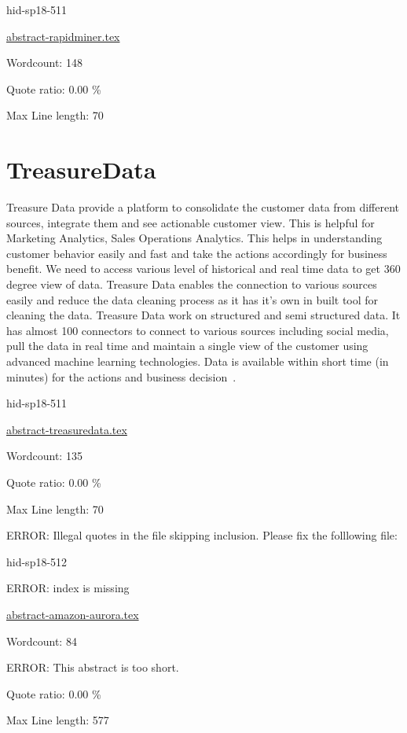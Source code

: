 \begin{IU}

hid-sp18-511

\href{https://github.com/cloudmesh-community/hid-sp18-511/blob/master//technology/abstract-rapidminer.tex}{abstract-rapidminer.tex}

 

Wordcount: 148


Quote ratio: 0.00 \%
 
Max Line length: 70
\end{IU}

\section{TreasureData}

Treasure Data provide a platform to consolidate the customer data from
different sources, integrate them and see actionable customer view.
This is helpful for Marketing Analytics, Sales Operations Analytics.
This helps in understanding customer behavior easily and fast and take
the actions accordingly for business benefit. We need to access
various level of historical and real time data to get 360 degree view
of data. Treasure Data enables the connection to various sources
easily and reduce the data cleaning process as it
has it's own in built tool for cleaning the data. Treasure Data work
on structured and semi structured data. It has almost 100 connectors
to connect to various sources including social media, pull the data in
real time and maintain a single view of the customer using advanced
machine learning technologies. Data is available within short time (in
minutes) for the actions and business
decision~\cite{hid-sp18-511-treasuredata}.


\begin{IU}

hid-sp18-511

\href{https://github.com/cloudmesh-community/hid-sp18-511/blob/master//technology/abstract-treasuredata.tex}{abstract-treasuredata.tex}

 

Wordcount: 135


Quote ratio: 0.00 \%
 
Max Line length: 70
\end{IU}

ERROR: Illegal quotes in the file skipping inclusion. Please fix the folllowing file:

\begin{IU}

hid-sp18-512

ERROR: index is missing

\href{https://github.com/cloudmesh-community/hid-sp18-512/blob/master//technology/abstract-amazon-aurora.tex}{abstract-amazon-aurora.tex}

 

Wordcount: 84

ERROR: This abstract is too short.


Quote ratio: 0.00 \%
 
Max Line length: 577
\end{IU}

